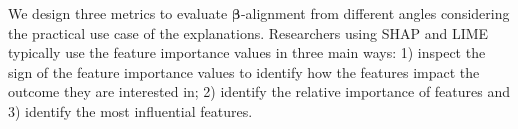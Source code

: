 \documentclass[mnsc,blindrev]{informs3}
\begin{document}
    



         
          We design three metrics to evaluate $\boldsymbol{\beta}$-alignment from different angles considering the practical use case of the explanations. Researchers using SHAP and LIME typically use the feature importance values in three main ways: 1) inspect the sign of the feature importance values to identify how the features impact the outcome they are interested in; %
         2)  identify the relative importance of features %
         and 3) identify the most influential features. %
\end{document}
